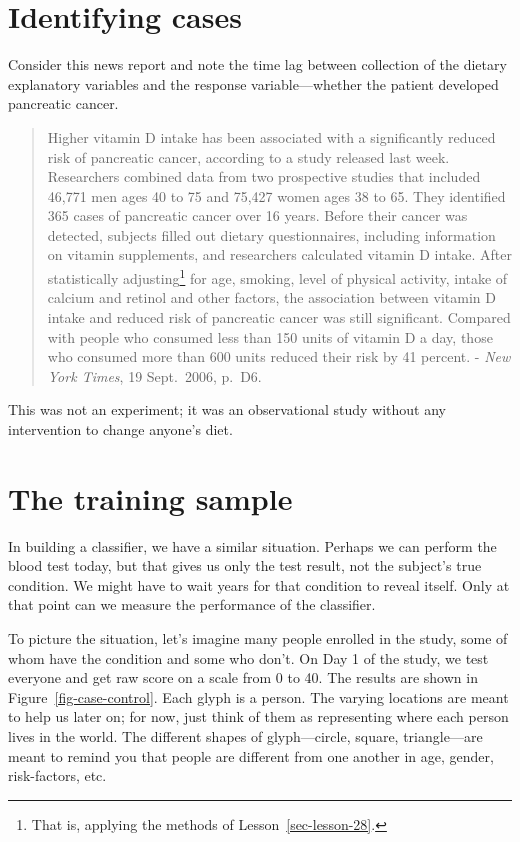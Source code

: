\documentclass[
  letterpaper,
  DIV=11,
  numbers=noendperiod,
  oneside]{scrreprt}
\begin{document}
\hypertarget{identifying-cases}{%
\section{Identifying cases}\label{identifying-cases}}

Consider this news report and note the time lag between collection of
the dietary explanatory variables and the response variable---whether
the patient developed pancreatic cancer.

\begin{quote}
Higher vitamin D intake has been associated with a significantly reduced
risk of pancreatic cancer, according to a study released last week.
Researchers combined data from two prospective studies that included
46,771 men ages 40 to 75 and 75,427 women ages 38 to 65. They identified
365 cases of pancreatic cancer over 16 years. Before their cancer was
detected, subjects filled out dietary questionnaires, including
information on vitamin supplements, and researchers calculated vitamin D
intake. After statistically adjusting\footnote{That is, applying the
  methods of Lesson~\ref{sec-lesson-28}.} for age, smoking, level of
physical activity, intake of calcium and retinol and other factors, the
association between vitamin D intake and reduced risk of pancreatic
cancer was still significant. Compared with people who consumed less
than 150 units of vitamin D a day, those who consumed more than 600
units reduced their risk by 41 percent. - \emph{New York Times}, 19
Sept.~2006, p.~D6.
\end{quote}

This was not an experiment; it was an observational study without any
intervention to change anyone's diet.

\hypertarget{the-training-sample}{%
\section{The training sample}\label{the-training-sample}}

In building a classifier, we have a similar situation. Perhaps we can
perform the blood test today, but that gives us only the test result,
not the subject's true condition. We might have to wait years for that
condition to reveal itself. Only at that point can we measure the
performance of the classifier.

To picture the situation, let's imagine many people enrolled in the
study, some of whom have the condition and some who don't. On Day 1 of
the study, we test everyone and get raw score on a scale from 0 to 40.
The results are shown in Figure~\ref{fig-case-control}. Each glyph is a
person. The varying locations are meant to help us later on; for now,
just think of them as representing where each person lives in the world.
The different shapes of glyph---circle, square, triangle---are meant to
remind you that people are different from one another in age, gender,
risk-factors, etc.
\end{document}
